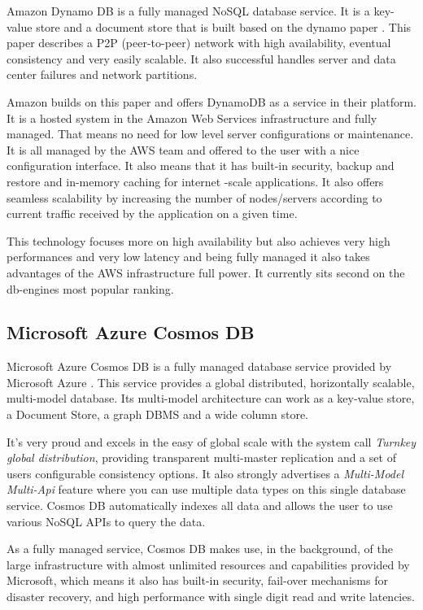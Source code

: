 Amazon Dynamo DB \cite{dynamo:1} is a fully managed NoSQL database service. It is a key-value store and a document store that is built based on the dynamo paper \cite{dynamo:2}. This paper describes a \gls{P2P} (peer-to-peer) network with high availability, eventual consistency and very easily scalable. It also successful handles server and data center failures and network partitions.

Amazon builds on this paper and offers DynamoDB as a service in their platform. It is a hosted system in the Amazon Web Services \cite{aws:1} infrastructure and fully managed. That means no need for low level server configurations or maintenance. It is all managed by the \gls{AWS} team and offered to the user with a nice configuration interface. It also means that it has built-in security, backup and restore and in-memory caching for internet -scale applications. It also offers seamless scalability by increasing the number of nodes/servers according to current traffic received by the application on a given time. 

This technology focuses more on high availability but also achieves very high performances and very low latency and being fully managed it also takes advantages of the \gls{AWS} infrastructure full power. It currently sits second on the db-engines \cite{db-engine:2} most popular ranking.

\subsection{Microsoft Azure Cosmos DB}
\label{ssec:microsoft_azure_cosmos_db}

Microsoft Azure Cosmos DB \cite{cosmos:1} is a fully managed database service provided by Microsoft Azure \cite{azure:1}. This service provides a global distributed, horizontally scalable, multi-model database. Its multi-model architecture can work as a key-value store, a Document Store, a graph \gls{DBMS} and a wide column store.

It's very proud and excels in the easy of global scale with the system call \textit{Turnkey global distribution}, providing transparent multi-master replication and a set of users configurable consistency options. It also strongly advertises a \textit{Multi-Model Multi-Api} feature where you can use multiple data types on this single database service. Cosmos DB automatically indexes all data and allows the user to use various NoSQL APIs to query the data.

As a fully managed service, Cosmos DB makes use, in the background, of the large infrastructure with almost unlimited resources and capabilities provided by Microsoft, which means it also has built-in security, fail-over mechanisms for disaster recovery, and high performance with single digit read and write latencies.

